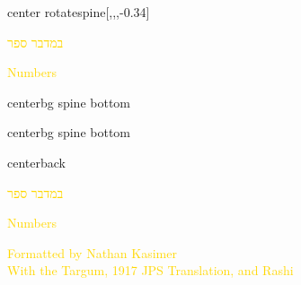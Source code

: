 \documentclass[
coverheight=9.93in,%
coverwidth=7.565in,%
spinewidth=.75in,
bleedwidth=.75in,
marklength=0in,
12pt,
pagecolor=darkblue,
]{bookcover}
\newcommand{\hebtext}[1]{
\begin{hebrew}
	#1
\end{hebrew}
}
\begin{document}
	\begin{bookcover}
	\begin{bookcoverelement}{center rotate}{spine}[,,,-0.34\coverheight]
		\LARGE\textcolor{gold}{\hebtext{במדבר ספר} \space Numbers }
	\end{bookcoverelement}
	\begin{bookcoverelement}{center}{bg spine bottom}
		\raisebox{\bleedwidth+2\baselineskip}{\textcolor{gold}{Kasimer}}
	\end{bookcoverelement}
	\begin{bookcoverelement}{center}{bg spine bottom}
		\raisebox{\bleedwidth}{\textcolor{gold}{Edition}}
	\end{bookcoverelement}

	\begin{bookcoverelement}{center}{back}
		\begin{Huge}
			\textcolor{gold}{\hebtext{במדבר ספר}}
			
			\textcolor{gold}{Numbers}
				
		\end{Huge}
		\vspace{2\baselineskip}
		\begin{large}
			\textcolor{gold}{Formatted by Nathan Kasimer\\With the Targum, 1917 JPS Translation, and Rashi}
		\end{large}
	\end{bookcoverelement}
	\end{bookcover}
	
\end{document}
